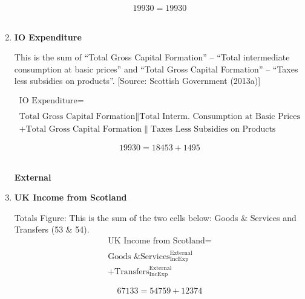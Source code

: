 \begin{enumerate}
\begin{equation} \nonumber
19930 = 19930
\end{equation}\\


\item \textbf {IO Expenditure}

This is the sum of “Total Gross Capital Formation” – “Total intermediate consumption at basic prices” and “Total Gross Capital Formation” – “Taxes less subsidies on products”. [Source: Scottish Government (2013a)]

\begin{equation}
\begin{split}
\text{IO Expenditure} =  \\ \\
\text{Total Gross Capital Formation}\|\text{Total Interm. Consumption at Basic Prices}\\
+\text{Total Gross Capital Formation}\|\text{Taxes Less Subsidies on Products}
\end{split} \label{eq:2.5.54}
\end{equation}

\begin{equation} \nonumber
19930 = 18453+1495
\end{equation}\\



\pagebreak


\begin{center}
\textbf{\LARGE External}
\end{center}

\item \textbf {UK Income from Scotland}

Totals Figure: This is the sum of the two cells below: Goods \& Services and Transfers (53 \& 54).\\

\begin{equation}
\begin{split}
\text{UK Income from Scotland} =  \\ \\
\text{Goods \& Services}^\text{External}_\text{IncExp}\\
+\text{Transfers}^\text{External}_\text{IncExp}
\end{split} \label{eq:2.5.55}
\end{equation}

\begin{equation} \nonumber
67133 = 54759+12374
\end{equation}\\



\end{enumerate}

